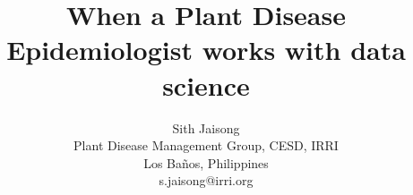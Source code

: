 \documentclass[12pt,a4paper]{article}
\begin{document}
\thispagestyle{empty}

\title{\textbf{When a Plant Disease Epidemiologist works with data science}}
\author{Sith Jaisong \\
Plant Disease Management Group, CESD, IRRI\\ Los Ba\~{n}os, Philippines\\
s.jaisong@irri.org}
\date{} %
\maketitle\thispagestyle{empty} %


%
%
%
%
%
\end{document}
